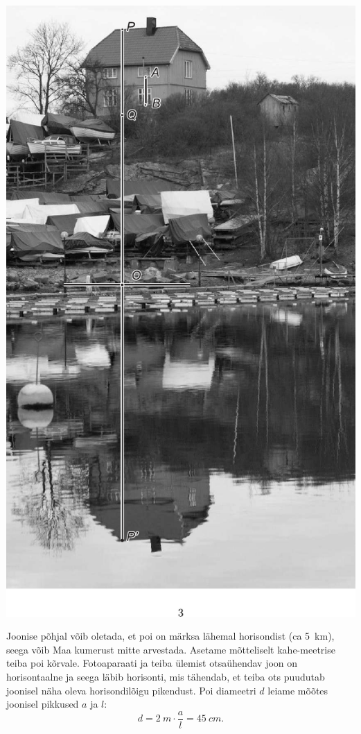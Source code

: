 \documentclass[10pt, twoside]{article}
\begin{document}
{\begin{center}
	\includegraphics[height=\textheight]{2008-v3g-04-lah}
\end{center}
\probend
\bigskip


\solu
Joonise põhjal võib oletada, et poi on märksa lähemal horisondist (ca \SI{5}{km}), seega võib Maa kumerust mitte arvestada. Asetame mõtteliselt kahe-meetrise teiba poi kõrvale. Fotoaparaati ja teiba ülemist otsaühendav joon on horisontaalne ja seega läbib horisonti, mis tähendab, et teiba ots puudutab joonisel näha oleva horisondilõigu pikendust. Poi diameetri $d$ leiame mõõtes joonisel pikkused $a$ ja $l$:
\[
d = \SI{2}{m} \cdot \frac al = \SI{45}{cm}.
\]

}
\end{document}
